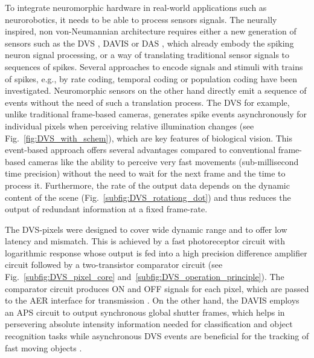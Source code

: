 To integrate neuromorphic hardware in real-world applications such as neurorobotics, it needs to be able to process sensors signals.
The neurally inspired, non von-Neumannian architecture requires either a new generation of sensors such as the \ac{DVS} \parencite{Lichtsteiner2008}, \ac{DAVIS} \parencite{Brandli2014} or \ac{DAS} \parencite{Liu2014}, which already embody the spiking neuron signal processing, or a way of translating traditional sensor signals to sequences of spikes.
Several approaches to encode signals and stimuli with trains of spikes, e.g., by rate coding, temporal coding \parencite[Chap. 7.6]{Gerstner2014} or population coding \parencites[Chap. 1]{Gerstner2002}{Ponulak2011} have been investigated.
Neuromorphic sensors on the other hand directly emit a sequence of events without the need of such a translation process.
The \ac{DVS} for example, unlike traditional frame-based cameras, generates spike events \parencite{Lichtsteiner2008} asynchronously for individual pixels when perceiving relative illumination changes (see Fig.~\ref{fig:DVS_with_schem}), which are key features of biological vision.
This event-based approach offers several advantages compared to conventional frame-based cameras like the ability to perceive very fast movements (sub-millisecond time precision) without the need to wait for the next frame and the time to process it.
Furthermore, the rate of the output data depends on the dynamic content of the scene (Fig.~\ref{subfig:DVS_rotationg_dot}) and thus reduces the output of redundant information at a fixed frame-rate.

The \ac{DVS}-pixels were designed to cover wide dynamic range and to offer low latency and mismatch.
This is achieved by a fast photoreceptor circuit with logarithmic response whose output is fed into a high precision difference amplifier circuit followed by a two-transistor comparator circuit (see Fig.~\ref{subfig:DVS_pixel_core} and~\ref{subfig:DVS_operation_principle}).
The comparator circuit produces ON and OFF signals for each pixel, which are passed to the \ac{AER} interface for transmission \parencite{Lichtsteiner2008}.
On the other hand, the \ac{DAVIS} employs an \ac{APS} circuit to output synchronous global shutter frames, which helps in persevering absolute intensity information needed for classification and object recognition tasks while asynchronous \ac{DVS} events are beneficial for the tracking of fast moving objects \parencite{Brandli2014}.


